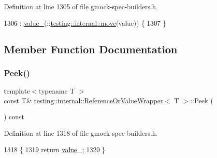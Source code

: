 Definition at line 1305 of file gmock-\/spec-\/builders.\+h.


\begin{DoxyCode}
1306       : \hyperlink{classtesting_1_1internal_1_1ReferenceOrValueWrapper_a62278a25c713a8440aa56f4eba0fa815}{value\_}(::\hyperlink{namespacetesting_1_1internal_a0f6d06bf8c3093b9c22bb08723db201e}{testing::internal::move}(value)) \{
1307   \}
\end{DoxyCode}


\subsection{Member Function Documentation}
\mbox{\label{classtesting_1_1internal_1_1ReferenceOrValueWrapper_a235cdb913959a71ad2a98fdd0965fe59}} 
\subsubsection{\texorpdfstring{Peek()}{Peek()}}
{\footnotesize\ttfamily template$<$typename T $>$ \\
const T\& \hyperlink{classtesting_1_1internal_1_1ReferenceOrValueWrapper}{testing\+::internal\+::\+Reference\+Or\+Value\+Wrapper}$<$ T $>$\+::Peek (\begin{DoxyParamCaption}{ }\end{DoxyParamCaption}) const\hspace{0.3cm}{\ttfamily [inline]}}



Definition at line 1318 of file gmock-\/spec-\/builders.\+h.


\begin{DoxyCode}
1318                         \{
1319     \textcolor{keywordflow}{return} \hyperlink{classtesting_1_1internal_1_1ReferenceOrValueWrapper_a62278a25c713a8440aa56f4eba0fa815}{value\_};
1320   \}
\end{DoxyCode}
\mbox{\label{classtesting_1_1internal_1_1ReferenceOrValueWrapper_a5a6505b809ba770725e7b8091927a5ba}} 
